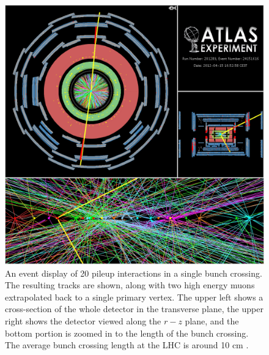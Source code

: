 \begin{figure}[ht!]
\centering
\includegraphics[width=.8\textwidth]{figures/lhc/pileup_vertexing.png}
\caption{An event display of 20 pileup interactions in a single bunch crossing. 
The resulting tracks are shown, along with two high energy muons extrapolated back
to a single primary vertex. The upper left shows a cross-section of the whole
detector in the transverse plane, the upper right shows
the detector viewed along the $r-z$ plane, and 
the bottom portion is zoomed in to the length of the bunch crossing. 
The average bunch crossing length at the LHC is around 10 cm \cite{PDG:2014}.  }
\label{fig:lhc_pileup}
\end{figure}


